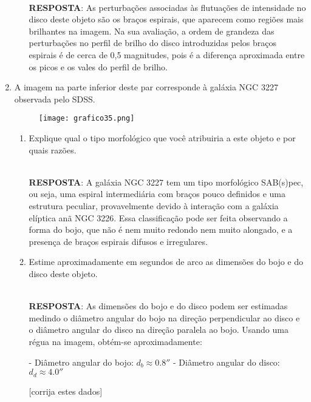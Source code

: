 \documentclass[a4paper,12pt]{article}
\begin{document}
\begin{enumerate}
\begin{enumerate}
\noindent\hrulefill\\\textbf{RESPOSTA}: As perturbações associadas às flutuações de intensidade no disco deste objeto são os braços espirais, que aparecem como regiões mais brilhantes na imagem. Na sua avaliação, a ordem de grandeza das perturbações no perfil de brilho do disco introduzidas pelos braços espirais é de cerca de 0,5 magnitudes, pois é a diferença aproximada entre os picos e os vales do perfil de brilho.

\noindent\hrulefill

\end{enumerate}

\item A imagem na parte inferior deste par corresponde à galáxia NGC 3227 observada pelo SDSS.

\begin{figure}[H]
\centering
\texttt{[image: grafico35.png]}
\end{figure}


\begin{enumerate}
\item Explique qual o tipo morfológico que você atribuiria a este objeto e por quais razões.

\noindent\hrulefill\\\textbf{RESPOSTA}: A galáxia NGC 3227 tem um tipo morfológico SAB(s)pec, ou seja, uma espiral intermediária com braços pouco definidos e uma estrutura peculiar, provavelmente devido à interação com a galáxia elíptica anã NGC 3226. Essa classificação pode ser feita observando a forma do bojo, que não é nem muito redondo nem muito alongado, e a presença de braços espirais difusos e irregulares.

\noindent\hrulefill

\item Estime aproximadamente em segundos de arco as dimensões do bojo e do disco deste objeto.

\noindent\hrulefill\\\textbf{RESPOSTA}: As dimensões do bojo e do disco podem ser estimadas medindo o diâmetro angular do bojo na direção perpendicular ao disco e o diâmetro angular do disco na direção paralela ao bojo. Usando uma régua na imagem, obtém-se aproximadamente:

- Diâmetro angular do bojo: $d_b \approx 0.8''$
- Diâmetro angular do disco: $d_d \approx 4.0''$

[corrija estes dados]

\noindent\hrulefill


\end{enumerate}
\end{enumerate}
\end{document}
